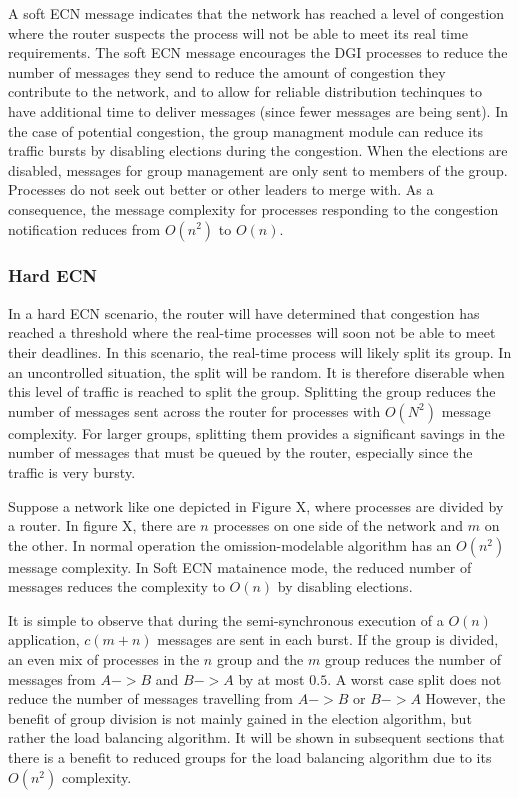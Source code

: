 A soft ECN message indicates that the network has reached a level of congestion where the router suspects the process will not be able to meet its real time requirements.
The soft ECN message encourages the DGI processes to reduce the number of messages they send to reduce the amount of congestion they contribute to the network, and to allow for reliable distribution techinques to have additional time to deliver messages (since fewer messages are being sent).
In the case of potential congestion, the group managment module can reduce its traffic bursts by disabling elections during the congestion.
When the elections are disabled, messages for group management are only sent to members of the group.
Processes do not seek out better or other leaders to merge with.
As a consequence, the message complexity for processes responding to the congestion notification reduces from $O(n^2)$ to $O(n)$.

\subsubsection{Hard ECN}

In a hard ECN scenario, the router will have determined that congestion has reached a threshold where the real-time processes will soon not be able to meet their deadlines.
In this scenario, the real-time process will likely split its group.
In an uncontrolled situation, the split will be random.
It is therefore diserable when this level of traffic is reached to split the group.
Splitting the group reduces the number of messages sent across the router for processes with $O(N^2)$ message complexity.
For larger groups, splitting them provides a significant savings in the number of messages that must be queued by the router, especially since the traffic is very bursty.

Suppose a network like one depicted in Figure X, where processes are divided by a router.
In figure X, there are $n$ processes on one side of the network and $m$ on the other.
In normal operation the omission-modelable algorithm has an $O(n^2)$ message complexity.
In Soft ECN matainence mode, the reduced number of messages reduces the complexity to $O(n)$ by disabling elections.

It is simple to observe that during the semi-synchronous execution of a $O(n)$ application, $c(m+n)$ messages are sent in each burst.
If the group is divided, an even mix of processes in the $n$ group and the $m$ group reduces the number of messages from $A->B$ and $B->A$ by at most $0.5$.
A worst case split does not reduce the number of messages travelling from $A->B$ or $B->A$
However, the benefit of group division is not mainly gained in the election algorithm, but rather the load balancing algorithm.
It will be shown in subsequent sections that there is a benefit to reduced groups for the load balancing algorithm due to its $O(n^2)$ complexity.

